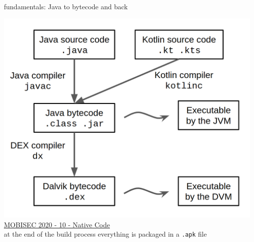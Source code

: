 \documentclass{beamer}
\begin{document}
\begin{frame}{fundamentals: Java to bytecode and back}

    \centering \includegraphics[scale=0.2]{java-to-dex.png}\\
    \href{https://docs.google.com/presentation/d/14nid9QJrSRUd4T_48KZMhWqKT_UdLg7EM-RH0HFQYdM}{MOBISEC 2020 - 10 - Native Code} \\
    at the end of the build process everything is packaged in a \texttt{.apk} file
\end{frame}





\end{document}
